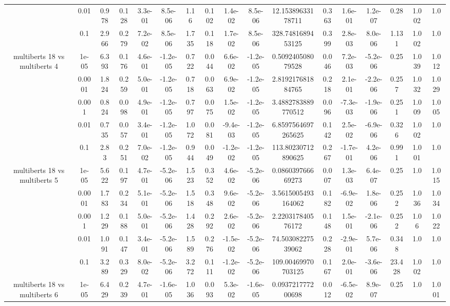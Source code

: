 \begin{tabular}{|c|c|c|c|c|c|c|c|c|c|c|c|c|c|c|c|c|}
 & 0.01 & 0.978 & 0.128 & 3.3e-01 & 8.5e-06 & 1.16 & 0.102 & 1.4e-02 & 8.5e-06 & 12.15389633178711 & 0.363 & 1.6e-01 & 1.2e-07 & 0.28 & 1.002 & 1.0 \\
 & 0.1 & 2.966 & 0.279 & 7.2e-02 & 8.5e-06 & 1.735 & 0.118 & 1.7e-02 & 8.5e-06 & 328.7481689453125 & 0.399 & 2.8e-03 & 8.0e-06 & 1.131 & 1.002 & 1.0 \\
\hline
\multirow{5}{*}{multiberts 18 vs multiberts 4} & 1e-05 & 6.393 & 0.176 & 4.6e-01 & -1.2e-05 & 0.722 & 0.044 & 6.6e-02 & -1.2e-05 & 0.509240508079528 & 0.046 & 7.2e-03 & -5.2e-06 & 0.25 & 1.039 & 1.012 \\
 & 0.0001 & 1.824 & 0.259 & 5.0e-01 & -1.2e-05 & 0.718 & 0.063 & 6.9e-02 & -1.2e-05 & 2.819217681884765 & 0.218 & 2.1e-01 & -2.2e-06 & 0.257 & 1.032 & 1.029 \\
 & 0.001 & 0.824 & 0.098 & 4.9e-01 & -1.2e-05 & 0.797 & 0.075 & 1.5e-02 & -1.2e-05 & 3.4882783889770512 & 0.096 & -7.3e-03 & -1.9e-06 & 0.251 & 1.009 & 1.005 \\
 & 0.01 & 0.735 & 0.057 & 3.4e-01 & -1.2e-05 & 1.072 & 0.081 & -9.4e-03 & -1.2e-05 & 6.8597564697265625 & 0.142 & 2.5e-02 & -6.9e-06 & 0.326 & 1.002 & 1.0 \\
 & 0.1 & 2.83 & 0.251 & 7.0e-02 & -1.2e-05 & 0.944 & 0.049 & -1.2e-02 & -1.2e-05 & 113.80230712890625 & 0.267 & -1.7e-01 & 4.2e-06 & 0.991 & 1.001 & 1.0 \\
\hline
\multirow{5}{*}{multiberts 18 vs multiberts 5} & 1e-05 & 5.622 & 0.197 & 4.7e-01 & -5.2e-06 & 1.523 & 0.352 & 4.6e-02 & -5.2e-06 & 0.086039766669273 & 0.007 & 1.3e-03 & 6.4e-07 & 0.25 & 1.0 & 1.015 \\
 & 0.0001 & 1.783 & 0.234 & 5.1e-01 & -5.2e-06 & 1.518 & 0.348 & 9.6e-02 & -5.2e-06 & 3.5615005493164062 & 0.182 & -6.9e-02 & 1.8e-06 & 0.252 & 1.036 & 1.034 \\
 & 0.001 & 1.229 & 0.188 & 5.0e-01 & -5.2e-06 & 1.428 & 0.292 & 2.6e-02 & -5.2e-06 & 2.220317840576172 & 0.148 & 1.5e-01 & -2.1e-06 & 0.252 & 1.06 & 1.022 \\
 & 0.01 & 1.091 & 0.147 & 3.4e-01 & -5.2e-06 & 1.589 & 0.276 & -1.5e-02 & -5.2e-06 & 74.50308227539062 & 0.228 & -2.9e-01 & 5.7e-06 & 0.348 & 1.0 & 1.0 \\
 & 0.1 & 3.289 & 0.329 & 8.0e-02 & -5.2e-06 & 3.272 & 0.111 & -1.2e-02 & -5.2e-06 & 109.00469970703125 & 0.167 & 2.0e-01 & -3.6e-06 & 23.428 & 1.002 & 1.0 \\
\hline
\multirow{5}{*}{multiberts 18 vs multiberts 6} & 1e-05 & 6.429 & 0.239 & 4.7e-01 & -1.6e-05 & 1.036 & 0.093 & 5.3e-02 & -1.6e-05 & 0.093721777200698 & 0.012 & -6.5e-02 & 8.9e-07 & 0.25 & 1.0 & 1.001 \\

\end{tabular}
